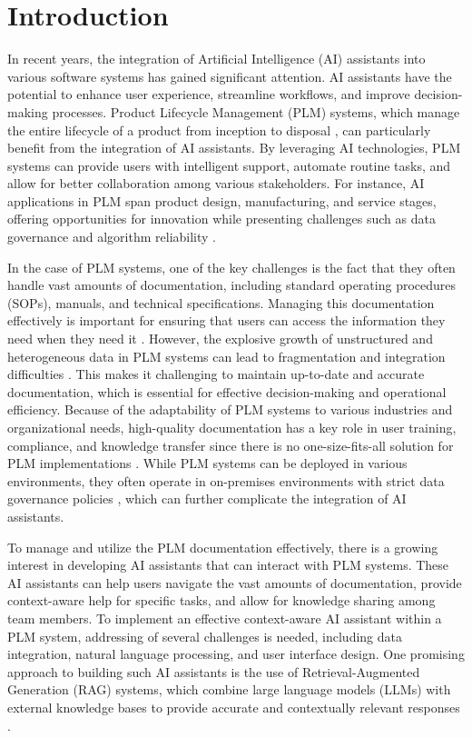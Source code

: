 \chapter{Introduction}
\label{ch:introduction}

In recent years, the integration of Artificial Intelligence (AI) assistants into various software systems has gained significant attention. AI assistants have the potential to enhance user experience, streamline workflows, and improve decision-making processes. Product Lifecycle Management (PLM) systems, which manage the entire lifecycle of a product from inception to disposal \parencite{starkProductLifecycleManagement2015}, can particularly benefit from the integration of AI assistants. By leveraging AI technologies, PLM systems can provide users with intelligent support, automate routine tasks, and allow for better collaboration among various stakeholders. For instance, AI applications in PLM span product design, manufacturing, and service stages, offering opportunities for innovation while presenting challenges such as data governance and algorithm reliability \parencite{wangArtificialIntelligenceProduct2021}.

In the case of PLM systems, one of the key challenges is the fact that they often handle vast amounts of documentation, including standard operating procedures (SOPs), manuals, and technical specifications. Managing this documentation effectively is important for ensuring that users can access the information they need when they need it \parencite{starkProductLifecycleManagement2015}. However, the explosive growth of unstructured and heterogeneous data in PLM systems can lead to fragmentation and integration difficulties \parencite{wangArtificialIntelligenceProduct2021}. This makes it challenging to maintain up-to-date and accurate documentation, which is essential for effective decision-making and operational efficiency. Because of the adaptability of PLM systems to various industries and organizational needs, high-quality documentation has a key role in user training, compliance, and knowledge transfer since there is no one-size-fits-all solution for PLM implementations \parencite{starkProductLifecycleManagement2015a}. While PLM systems can be deployed in various environments, they often operate in on-premises environments with strict data governance policies \parencite{ugniusOnPremiseCloudHosting2023}, which can further complicate the integration of AI assistants.

To manage and utilize the PLM documentation effectively, there is a growing interest in developing AI assistants that can interact with PLM systems. These AI assistants can help users navigate the vast amounts of documentation, provide context-aware help for specific tasks, and allow for knowledge sharing among team members. To implement an effective context-aware AI assistant within a PLM system, addressing of several challenges is needed, including data integration, natural language processing, and user interface design. One promising approach to building such AI assistants is the use of Retrieval-Augmented Generation (RAG) systems, which combine large language models (LLMs) with external knowledge bases to provide accurate and contextually relevant responses \parencite{NEURIPS2020_6b493230}.

